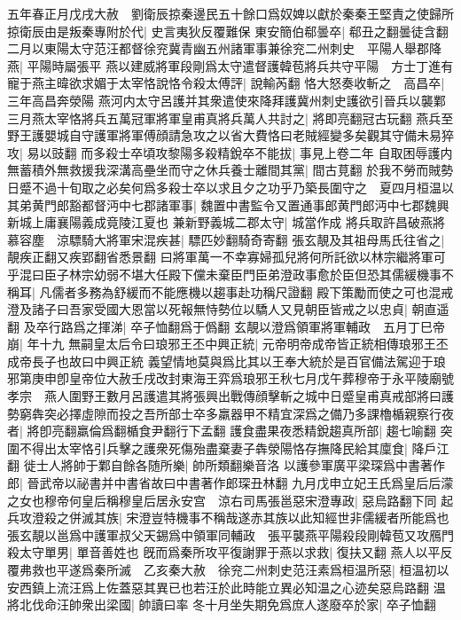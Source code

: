 五年春正月戊戌大赦　劉衛辰掠秦邊民五十餘口爲奴婢以獻於秦秦王堅責之使歸所掠衛辰由是叛秦專附於代|{
	史言夷狄反覆難保}
東安簡伯郗曇卒|{
	郗丑之翻曇徒含翻}
二月以東陽太守范汪都督徐兖冀青幽五州諸軍事兼徐兖二州刺史　平陽人舉郡降燕|{
	平陽時屬張平}
燕以建威將軍段剛爲太守遣督護韓苞將兵共守平陽　方士丁進有寵于燕主暐欲求媚于太宰恪說恪令殺太傅評|{
	說輸芮翻}
恪大怒奏收斬之　高昌卒|{
	三年高昌奔滎陽}
燕河内太守呂護并其衆遣使來降拜護冀州刺史護欲引晉兵以襲鄴三月燕太宰恪將兵五萬冠軍將軍皇甫真將兵萬人共討之|{
	將即亮翻冠古玩翻}
燕兵至野王護嬰城自守護軍將軍傅顔請急攻之以省大費恪曰老賊經變多矣觀其守備未易猝攻|{
	易以豉翻}
而多殺士卒頃攻黎陽多殺精銳卒不能拔|{
	事見上卷二年}
自取困辱護内無蓄積外無救援我深溝高壘坐而守之休兵養士離間其黨|{
	間古莧翻}
於我不勞而賊勢日蹙不過十旬取之必矣何爲多殺士卒以求且夕之功乎乃築長圍守之　夏四月桓温以其弟黄門郎豁都督沔中七郡諸軍事|{
	魏置中書監令又置通事郎黄門郎沔中七郡魏興新城上庸襄陽義成竟陵江夏也}
兼新野義城二郡太守|{
	城當作成}
將兵取許昌破燕將慕容塵　涼驃騎大將軍宋混疾甚|{
	驃匹妙翻騎奇寄翻}
張玄靚及其祖母馬氏往省之|{
	靚疾正翻又疾郢翻省悉景翻}
曰將軍萬一不幸寡婦孤兒將何所託欲以林宗繼將軍可乎混曰臣子林宗幼弱不堪大任殿下儻未棄臣門臣弟澄政事愈於臣但恐其儒緩機事不稱耳|{
	凡儒者多務為舒緩而不能應機以趨事赴功稱尺證翻}
殿下策勵而使之可也混戒澄及諸子曰吾家受國大恩當以死報無恃勢位以驕人又見朝臣皆戒之以忠貞|{
	朝直遥翻}
及卒行路爲之揮涕|{
	卒子恤翻爲于僞翻}
玄靚以澄爲領軍將軍輔政　五月丁巳帝崩|{
	年十九}
無嗣皇太后令曰琅邪王丕中興正統|{
	元帝明帝成帝皆正統相傳琅邪王丕成帝長子也故曰中興正統}
義望情地莫與爲比其以王奉大統於是百官備法駕迎于琅邪第庚申卽皇帝位大赦壬戌改封東海王弈爲琅邪王秋七月戊午葬穆帝于永平陵廟號孝宗　燕人圍野王數月呂護遣其將張興出戰傳顔擊斬之城中日蹙皇甫真戒部將曰護勢窮犇突必擇虛隙而投之吾所部士卒多羸器甲不精宜深爲之備乃多課櫓楯親察行夜者|{
	將卽亮翻羸倫爲翻楯食尹翻行下孟翻}
護食盡果夜悉精銳趨真所部|{
	趨七喻翻}
突圍不得出太宰恪引兵擊之護衆死傷殆盡棄妻子犇滎陽恪存撫降民給其廩食|{
	降戶江翻}
徙士人將帥于鄴自餘各随所樂|{
	帥所類翻樂音洛}
以護參軍廣平梁琛爲中書著作郎|{
	晉武帝以祕書并中書省故曰中書著作郎琛丑林翻}
九月戊申立妃王氏爲皇后后濛之女也穆帝何皇后稱穆皇后居永安宫　涼右司馬張邕惡宋澄專政|{
	惡烏路翻下同}
起兵攻澄殺之併滅其族|{
	宋澄豈特機事不稱哉遂赤其族以此知經世非儒緩者所能爲也}
張玄靚以邕爲中護軍叔父天錫爲中領軍同輔政　張平襲燕平陽殺段剛韓苞又攻鴈門殺太守單男|{
	單音善姓也}
旣而爲秦所攻平復謝罪于燕以求救|{
	復扶又翻}
燕人以平反覆弗救也平遂爲秦所滅　乙亥秦大赦　徐兖二州刺史范汪素爲桓温所惡|{
	桓温初以安西鎮上流汪爲上佐蓋惡其異已也若汪於此時能立異必知温之心迹矣惡烏路翻}
温將北伐命汪帥衆出梁國|{
	帥讀曰率}
冬十月坐失期免爲庶人遂廢卒於家|{
	卒子恤翻}
